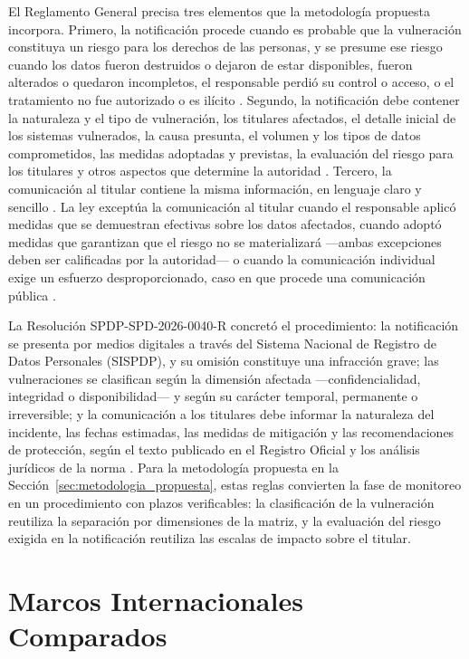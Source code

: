 El Reglamento General precisa tres elementos que la metodología propuesta incorpora. Primero, la notificación procede cuando es probable que la vulneración constituya un riesgo para los derechos de las personas, y se presume ese riesgo cuando los datos fueron destruidos o dejaron de estar disponibles, fueron alterados o quedaron incompletos, el responsable perdió su control o acceso, o el tratamiento no fue autorizado o es ilícito \cite[art.~24]{rlopdp2023}. Segundo, la notificación debe contener la naturaleza y el tipo de vulneración, los titulares afectados, el detalle inicial de los sistemas vulnerados, la causa presunta, el volumen y los tipos de datos comprometidos, las medidas adoptadas y previstas, la evaluación del riesgo para los titulares y otros aspectos que determine la autoridad \cite[art.~26]{rlopdp2023}. Tercero, la comunicación al titular contiene la misma información, en lenguaje claro y sencillo \cite[art.~28]{rlopdp2023}. La ley exceptúa la comunicación al titular cuando el responsable aplicó medidas que se demuestran efectivas sobre los datos afectados, cuando adoptó medidas que garantizan que el riesgo no se materializará ---ambas excepciones deben ser calificadas por la autoridad--- o cuando la comunicación individual exige un esfuerzo desproporcionado, caso en que procede una comunicación pública \cite[art.~46]{lopdp2021}.

La Resolución SPDP-SPD-2026-0040-R concretó el procedimiento: la notificación se presenta por medios digitales a través del Sistema Nacional de Registro de Datos Personales (SISPDP), y su omisión constituye una infracción grave; las vulneraciones se clasifican según la dimensión afectada ---confidencialidad, integridad o disponibilidad--- y según su carácter temporal, permanente o irreversible; y la comunicación a los titulares debe informar la naturaleza del incidente, las fechas estimadas, las medidas de mitigación y las recomendaciones de protección, según el texto publicado en el Registro Oficial y los análisis jurídicos de la norma \cite{spdp2026vulneraciones}. Para la metodología propuesta en la Sección~\ref{sec:metodologia_propuesta}, estas reglas convierten la fase de monitoreo en un procedimiento con plazos verificables: la clasificación de la vulneración reutiliza la separación por dimensiones de la matriz, y la evaluación del riesgo exigida en la notificación reutiliza las escalas de impacto sobre el titular.



\section{Marcos Internacionales Comparados}
\label{sec:marcos_internacionales}
\label{sec:contraste_paises}

